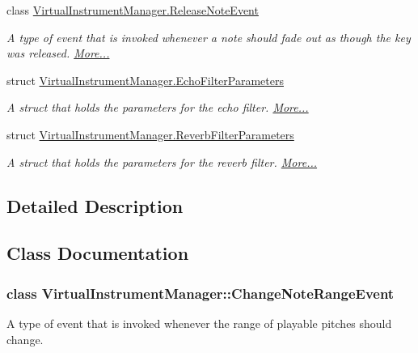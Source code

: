 \begin{DoxyCompactItemize}
class \hyperlink{group___event_types_class_virtual_instrument_manager_1_1_release_note_event}{Virtual\+Instrument\+Manager.\+Release\+Note\+Event}
\begin{DoxyCompactList}\small\item\em A type of event that is invoked whenever a note should fade out as though the key was released.  \hyperlink{group___event_types_class_virtual_instrument_manager_1_1_release_note_event}{More...}\end{DoxyCompactList}\item 
struct \hyperlink{group___event_types_struct_virtual_instrument_manager_1_1_echo_filter_parameters}{Virtual\+Instrument\+Manager.\+Echo\+Filter\+Parameters}
\begin{DoxyCompactList}\small\item\em A struct that holds the parameters for the echo filter.  \hyperlink{group___event_types_struct_virtual_instrument_manager_1_1_echo_filter_parameters}{More...}\end{DoxyCompactList}\item 
struct \hyperlink{group___event_types_struct_virtual_instrument_manager_1_1_reverb_filter_parameters}{Virtual\+Instrument\+Manager.\+Reverb\+Filter\+Parameters}
\begin{DoxyCompactList}\small\item\em A struct that holds the parameters for the reverb filter.  \hyperlink{group___event_types_struct_virtual_instrument_manager_1_1_reverb_filter_parameters}{More...}\end{DoxyCompactList}\end{DoxyCompactItemize}


\subsection{Detailed Description}


\subsection{Class Documentation}
\label{class_virtual_instrument_manager_1_1_change_note_range_event}
\subsubsection{class Virtual\+Instrument\+Manager\+:\+:Change\+Note\+Range\+Event}
A type of event that is invoked whenever the range of playable pitches should change. 

